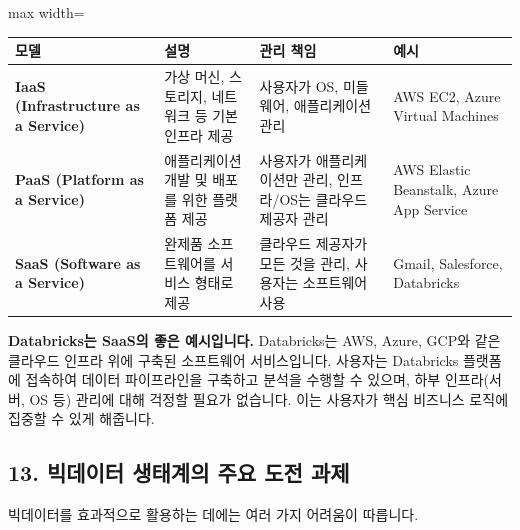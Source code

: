 \documentclass[11pt,a4paper]{article}
\begin{document}
\begin{adjustbox}{max width=\textwidth}
\begin{tabular}{llll}
\toprule
\textbf{모델} & \textbf{설명} & \textbf{관리 책임} & \textbf{예시} \\
\midrule
\textbf{IaaS (Infrastructure as a Service)} & 가상 머신, 스토리지, 네트워크 등 기본 인프라 제공 & 사용자가 OS, 미들웨어, 애플리케이션 관리 & AWS EC2, Azure Virtual Machines \\
\textbf{PaaS (Platform as a Service)} & 애플리케이션 개발 및 배포를 위한 플랫폼 제공 & 사용자가 애플리케이션만 관리, 인프라/OS는 클라우드 제공자 관리 & AWS Elastic Beanstalk, Azure App Service \\
\textbf{SaaS (Software as a Service)} & 완제품 소프트웨어를 서비스 형태로 제공 & 클라우드 제공자가 모든 것을 관리, 사용자는 소프트웨어 사용 & Gmail, Salesforce, Databricks \\
\bottomrule
\end{tabular}
\end{adjustbox}

\begin{examplebox}
\textbf{Databricks는 SaaS의 좋은 예시입니다.}
Databricks는 AWS, Azure, GCP와 같은 클라우드 인프라 위에 구축된 소프트웨어 서비스입니다. 사용자는 Databricks 플랫폼에 접속하여 데이터 파이프라인을 구축하고 분석을 수행할 수 있으며, 하부 인프라(서버, OS 등) 관리에 대해 걱정할 필요가 없습니다. 이는 사용자가 핵심 비즈니스 로직에 집중할 수 있게 해줍니다.
\end{examplebox}

\subsection*{13. 빅데이터 생태계의 주요 도전 과제}

빅데이터를 효과적으로 활용하는 데에는 여러 가지 어려움이 따릅니다.
\end{document}

